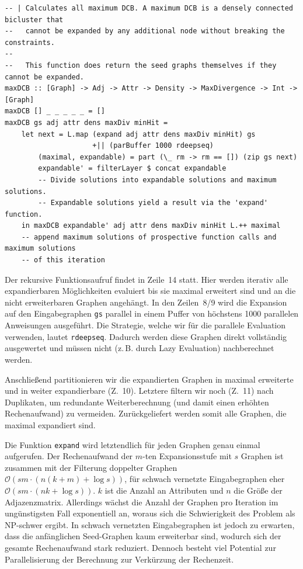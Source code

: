 \documentclass[a4paper]{scrartcl}
\begin{document}
\begin{lstlisting}[caption={Die maxDCB-Funktion},label=lst:maxDCB]
-- | Calculates all maximum DCB. A maximum DCB is a densely connected bicluster that
--   cannot be expanded by any additional node without breaking the constraints.
--   
--   This function does return the seed graphs themselves if they cannot be expanded.
maxDCB :: [Graph] -> Adj -> Attr -> Density -> MaxDivergence -> Int -> [Graph]
maxDCB [] _ _ _ _ _ = []
maxDCB gs adj attr dens maxDiv minHit =
    let next = L.map (expand adj attr dens maxDiv minHit) gs
                     +|| (parBuffer 1000 rdeepseq)
        (maximal, expandable) = part (\_ rm -> rm == []) (zip gs next)
        expandable' = filterLayer $ concat expandable
        -- Divide solutions into expandable solutions and maximum solutions.
        -- Expandable solutions yield a result via the 'expand' function.
    in maxDCB expandable' adj attr dens maxDiv minHit L.++ maximal
    -- append maximum solutions of prospective function calls and maximum solutions
    -- of this iteration
\end{lstlisting}

Der rekursive Funktionsaufruf findet in Zeile~14 statt. Hier werden iterativ alle expandierbaren Möglichkeiten evaluiert bis sie maximal erweitert sind und an die nicht erweiterbaren Graphen angehängt. In den Zeilen~8/9 wird die Expansion auf den Eingabegraphen \texttt{gs} parallel in einem Puffer von höchstens 1000 parallelen Anweisungen ausgeführt. Die Strategie, welche wir für die parallele Evaluation verwenden, lautet \texttt{rdeepseq}. Dadurch werden diese Graphen direkt vollständig ausgewertet und müssen nicht (z.\,B. durch Lazy Evaluation) nachberechnet werden.\par
\medskip
Anschließend partitionieren wir die expandierten Graphen in maximal erweiterte und in weiter expandierbare (Z.~10). Letztere filtern wir noch (Z.~11) nach Duplikaten, um redundante Weiterberechnung (und damit einen erhöhten Rechenaufwand) zu vermeiden. Zurückgeliefert werden somit alle Graphen, die maximal expandiert sind. \par
\medskip
Die Funktion \texttt{expand} wird letztendlich für jeden Graphen genau einmal aufgerufen. Der Rechenaufwand der $m$-ten Expansionsstufe mit $s$ Graphen ist zusammen mit der Filterung doppelter Graphen $\mathcal{O}(s m \cdot (n (k+m)+ \log s))$, für schwach vernetzte Eingabegraphen eher $\mathcal{O}(s m \cdot (n k + \log s))$. $k$ ist die Anzahl an Attributen und $n$ die Größe der Adjazenzmatrix. Allerdings wächst die Anzahl der Graphen pro Iteration im ungünstigsten Fall exponentiell an, woraus sich die Schwierigkeit des Problem als NP-schwer ergibt. In schwach vernetzten Eingabegraphen ist jedoch zu erwarten, dass die anfänglichen Seed-Graphen kaum erweiterbar sind, wodurch sich der gesamte Rechenaufwand stark reduziert. Dennoch besteht viel Potential zur Parallelisierung der Berechnung zur Verkürzung der Rechenzeit.
\end{document}

